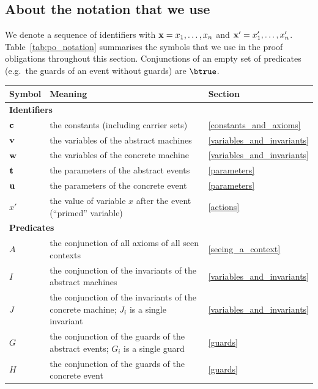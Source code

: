 \subsection{About the notation that we use}
\label{about_the_notation}

We denote a sequence of identifiers with $\mathbf{x} = x_1,\ldots,x_n$ and $\mathbf{x}' = x'_1,\ldots,x'_n$.
Table~\ref{tab:po_notation} summarises the symbols that we use in the proof obligations
throughout this section.  Conjunctions of an empty set of predicates (e.g.\ the guards of an
event without guards) are $\btrue$.

\begin{table}[!ht]
\centering
\begin{tabular}{l p{} l}
  \hline
  \textbf{Symbol} & \textbf{Meaning} & \textbf{Section} \\
  \hline
  \multicolumn{3}{l}{\textbf{Identifiers}} \\
  $\mathbf{c}$ & the constants (including carrier sets) & \ref{constants_and_axioms} \\
  $\mathbf{v}$ & the variables of the abstract machines & \ref{variables_and_invariants} \\
  $\mathbf{w}$ & the variables of the concrete machine & \ref{variables_and_invariants} \\
  $\mathbf{t}$ & the parameters of the abstract events & \ref{parameters} \\
  $\mathbf{u}$ & the parameters of the concrete event & \ref{parameters} \\
  $x'$ & the value of variable $x$ after the event (``primed'' variable) & \ref{actions} \\
  \hline
  \multicolumn{3}{l}{\textbf{Predicates}} \\
  $A$ & the conjunction of all axioms of all seen contexts & \ref{seeing_a_context} \\
  $I$ & the conjunction of the invariants of the abstract machines & \ref{variables_and_invariants} \\
  $J$ & the conjunction of the invariants of the concrete machine; $J_i$ is a single invariant & \ref{variables_and_invariants} \\
  $G$ & the conjunction of the guards of the abstract events; $G_i$ is a single guard & \ref{guards} \\
  $H$ & the conjunction of the guards of the concrete event & \ref{guards} \\

\end{tabular}
\end{table}
